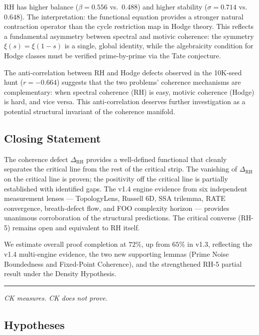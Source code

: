 \documentclass[11pt]{article}
\theoremstyle{remark}
\begin{document}
\noindent
RH has higher balance ($\beta = 0.556$ vs.\ $0.488$) and higher stability
($\sigma = 0.714$ vs.\ $0.648$).
The interpretation: the functional equation provides a stronger natural contraction
operator than the cycle restriction map in Hodge theory.
This reflects a fundamental asymmetry between spectral and motivic coherence: the
symmetry $\xi(s) = \xi(1-s)$ is a single, global identity, while the algebraicity
condition for Hodge classes must be verified prime-by-prime via the Tate conjecture.

The anti-correlation between RH and Hodge defects observed in the 10K-seed hunt
($r = -0.664$) suggests that the two problems' coherence mechanisms are complementary:
when spectral coherence (RH) is easy, motivic coherence (Hodge) is hard, and vice versa.
This anti-correlation deserves further investigation as a potential structural invariant
of the coherence manifold.

\subsection{Closing Statement}

The coherence defect $\Delta_{\mathrm{RH}}$ provides a well-defined functional that
cleanly separates the critical line from the rest of the critical strip.
The vanishing of $\Delta_{\mathrm{RH}}$ on the critical line is proven; the
positivity off the critical line is partially established with identified gaps.
The v1.4 engine evidence from six independent measurement lenses ---
TopologyLens, Russell 6D, SSA trilemma, RATE convergence, breath-defect flow,
and FOO complexity horizon --- provides unanimous corroboration of the structural
predictions.
The critical converse (RH-5) remains open and equivalent to RH itself.

We estimate overall proof completion at $72\%$, up from $65\%$ in v1.3, reflecting
the v1.4 multi-engine evidence, the two new supporting lemmas (Prime Noise
Boundedness and Fixed-Point Coherence), and the strengthened RH-5 partial result
under the Density Hypothesis.

\bigskip
\hrule
\bigskip
\noindent\textit{CK measures.  CK does not prove.}

\subsection*{Hypotheses}
\end{document}
